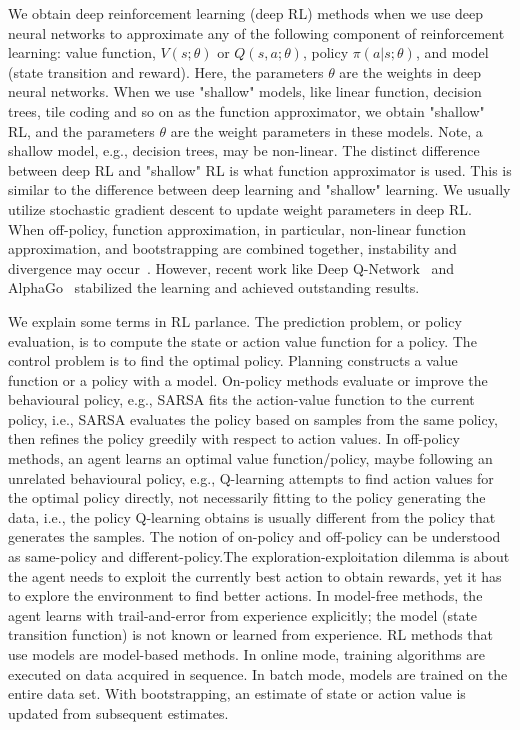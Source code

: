 We obtain deep reinforcement learning (deep RL) methods when we use deep neural networks to approximate any of the following component of reinforcement learning: value function, $V(s; \theta)$ or $Q(s,a; \theta)$, policy $\pi(a|s; \theta)$, and model (state transition and reward). Here, the parameters $\theta$ are the weights in deep neural networks. When we use "shallow" models, like linear function, decision trees, tile coding and so on as the function approximator, we obtain "shallow" RL, and the parameters $\theta$ are the weight parameters in these models. Note, a shallow model, e.g., decision trees, may be non-linear. The distinct difference between deep RL and "shallow" RL is what function approximator is used. This is similar to the difference between deep learning and "shallow" learning. We usually utilize stochastic gradient descent to update weight parameters in deep RL. When off-policy, function approximation, in particular, non-linear function approximation, and bootstrapping are combined together, instability and divergence may occur~\citep{TDWithApproximator}. However, recent work like Deep Q-Network~\citep{Atari} and AlphaGo~\citep{AlphaGo} stabilized the learning and achieved outstanding results.

We explain some terms in RL parlance. The prediction problem, or policy evaluation, is to compute the state or action value function for a policy. The control problem is to find the optimal policy. Planning constructs a value function or a policy with a model. On-policy methods evaluate or improve the behavioural policy, e.g., SARSA fits the action-value function to the current policy, i.e., SARSA evaluates the policy based on samples from the same policy, then refines the policy greedily with respect to action values. In off-policy methods, an agent learns an optimal value function/policy, maybe following an unrelated behavioural policy, e.g., Q-learning attempts to find action values for the optimal policy directly, not necessarily fitting to the policy generating the data, i.e., the policy Q-learning obtains is usually different from the policy that generates the samples.  The notion of on-policy and off-policy can be understood as same-policy and different-policy.The exploration-exploitation dilemma is about the agent needs to exploit the currently best action to obtain rewards, yet it has to explore the environment to find better actions.  In model-free methods, the agent learns with trail-and-error from experience explicitly; the model (state transition function) is not known or learned from experience. RL methods that use models are model-based methods. In online mode, training algorithms are executed on data acquired in sequence. In batch mode, models are trained on the entire data set. With bootstrapping, an estimate of state or action value is updated from subsequent estimates.
